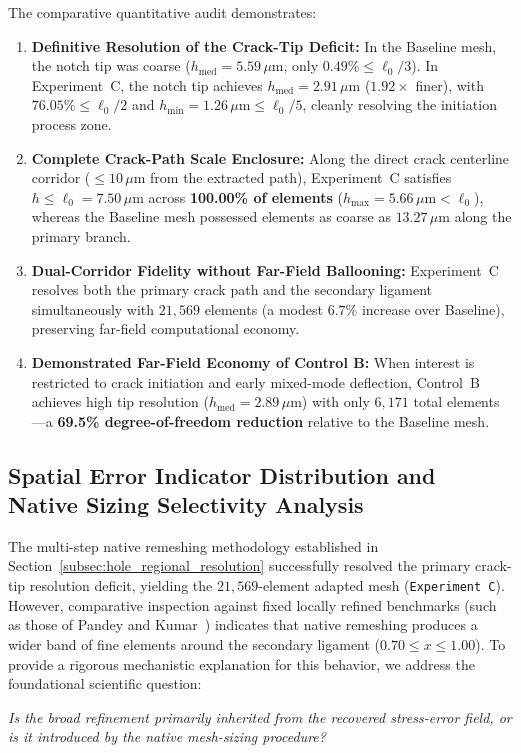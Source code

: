 The comparative quantitative audit demonstrates:
\begin{enumerate}
  \item \textbf{Definitive Resolution of the Crack-Tip Deficit:} In the Baseline mesh, the notch tip was coarse ($h_{\mathrm{med}} = 5.59\,\mu\mathrm{m}$, only $0.49\% \le \ell_0/3$). In Experiment~C, the notch tip achieves $h_{\mathrm{med}} = 2.91\,\mu\mathrm{m}$ ($1.92\times$ finer), with $76.05\% \le \ell_0/2$ and $h_{\min} = 1.26\,\mu\mathrm{m} \le \ell_0/5$, cleanly resolving the initiation process zone.
  \item \textbf{Complete Crack-Path Scale Enclosure:} Along the direct crack centerline corridor ($\le 10\,\mu\mathrm{m}$ from the extracted path), Experiment~C satisfies $h \le \ell_0 = 7.50\,\mu\mathrm{m}$ across \textbf{100.00\% of elements} ($h_{\max} = 5.66\,\mu\mathrm{m} < \ell_0$), whereas the Baseline mesh possessed elements as coarse as $13.27\,\mu\mathrm{m}$ along the primary branch.
  \item \textbf{Dual-Corridor Fidelity without Far-Field Ballooning:} Experiment~C resolves both the primary crack path and the secondary ligament simultaneously with $21{,}569$ elements (a modest $6.7\%$ increase over Baseline), preserving far-field computational economy.
  \item \textbf{Demonstrated Far-Field Economy of Control B:} When interest is restricted to crack initiation and early mixed-mode deflection, Control~B achieves high tip resolution ($h_{\mathrm{med}} = 2.89\,\mu\mathrm{m}$) with only $6{,}171$ total elements---a \textbf{69.5\% degree-of-freedom reduction} relative to the Baseline mesh.
\end{enumerate}

\subsection{Spatial Error Indicator Distribution and Native Sizing Selectivity Analysis}
\label{subsec:hole_indicator_and_sizing_selectivity}

The multi-step native remeshing methodology established in Section~\ref{subsec:hole_regional_resolution} successfully resolved the primary crack-tip resolution deficit, yielding the $21{,}569$-element adapted mesh (\texttt{Experiment C}). However, comparative inspection against fixed locally refined benchmarks (such as those of Pandey and Kumar~\citep{pandey2025}) indicates that native \Abaqus remeshing produces a wider band of fine elements around the secondary ligament ($0.70 \le x \le 1.00$). To provide a rigorous mechanistic explanation for this behavior, we address the foundational scientific question:
\begin{center}
\emph{Is the broad refinement primarily inherited from the recovered stress-error field, or is it introduced by the native \Abaqus mesh-sizing procedure?}
\end{center}

